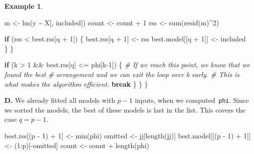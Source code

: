 \documentclass[
  a4paper,
]{article}
\newenvironment{Shaded}{\begin{snugshade}}{\end{snugshade}}
\newcommand{\CommentTok}[1]{\textcolor[rgb]{0.56,0.35,0.01}{\textit{#1}}}
\newcommand{\ControlFlowTok}[1]{\textcolor[rgb]{0.13,0.29,0.53}{\textbf{#1}}}
\newcommand{\DecValTok}[1]{\textcolor[rgb]{0.00,0.00,0.81}{#1}}
\newcommand{\FunctionTok}[1]{\textcolor[rgb]{0.00,0.00,0.00}{#1}}
\newcommand{\NormalTok}[1]{#1}
\newcommand{\OtherTok}[1]{\textcolor[rgb]{0.56,0.35,0.01}{#1}}
\newcommand{\SpecialCharTok}[1]{\textcolor[rgb]{0.00,0.00,0.00}{#1}}
\theoremstyle{definition}
\theoremstyle{definition}
\newtheorem{example}{Example}[section]
\theoremstyle{definition}
\theoremstyle{definition}
\theoremstyle{remark}
\begin{document}
\begin{example}
\begin{Shaded}
\begin{Highlighting}[]
\NormalTok{            m }\OtherTok{\textless{}{-}} \FunctionTok{lm}\NormalTok{(y }\SpecialCharTok{\textasciitilde{}}\NormalTok{ X[, included])}
\NormalTok{            count }\OtherTok{\textless{}{-}}\NormalTok{ count }\SpecialCharTok{+} \DecValTok{1}
\NormalTok{            rss }\OtherTok{\textless{}{-}} \FunctionTok{sum}\NormalTok{(}\FunctionTok{resid}\NormalTok{(m)}\SpecialCharTok{\^{}}\DecValTok{2}\NormalTok{)}

            \ControlFlowTok{if}\NormalTok{ (rss }\SpecialCharTok{\textless{}}\NormalTok{ best.rss[q }\SpecialCharTok{+} \DecValTok{1}\NormalTok{]) \{}
\NormalTok{                best.rss[q }\SpecialCharTok{+} \DecValTok{1}\NormalTok{] }\OtherTok{\textless{}{-}}\NormalTok{ rss}
\NormalTok{                best.model[[q }\SpecialCharTok{+} \DecValTok{1}\NormalTok{]] }\OtherTok{\textless{}{-}}\NormalTok{ included}
\NormalTok{            \}}
\NormalTok{        \}}

        \ControlFlowTok{if}\NormalTok{ (k }\SpecialCharTok{\textgreater{}} \DecValTok{1} \SpecialCharTok{\&\&}\NormalTok{ best.rss[q] }\SpecialCharTok{\textless{}=}\NormalTok{ phi[k}\DecValTok{{-}1}\NormalTok{]) \{}
            \CommentTok{\# If we reach this point, we know that we found the best}
            \CommentTok{\# arrangement and we can exit the loop over k early.}
            \CommentTok{\# This is what makes the algorithm efficient.}
            \ControlFlowTok{break}
\NormalTok{        \}}
\NormalTok{    \}}
\NormalTok{\}}
\end{Highlighting}
\end{Shaded}

\textbf{D.} We already fitted all models with \(p-1\) inputs, when we computed~\texttt{phi}.
Since we sorted the models, the best of these models is last in the list.
This covers the case \(q = p - 1\).

\begin{Shaded}
\begin{Highlighting}[]
\NormalTok{best.rss[(p }\SpecialCharTok{{-}} \DecValTok{1}\NormalTok{) }\SpecialCharTok{+} \DecValTok{1}\NormalTok{] }\OtherTok{\textless{}{-}} \FunctionTok{min}\NormalTok{(phi)}
\NormalTok{omitted }\OtherTok{\textless{}{-}}\NormalTok{ jj[}\FunctionTok{length}\NormalTok{(jj)]}
\NormalTok{best.model[[(p }\SpecialCharTok{{-}} \DecValTok{1}\NormalTok{) }\SpecialCharTok{+} \DecValTok{1}\NormalTok{]] }\OtherTok{\textless{}{-}}\NormalTok{ (}\DecValTok{1}\SpecialCharTok{:}\NormalTok{p)[}\SpecialCharTok{{-}}\NormalTok{omitted]}
\NormalTok{count }\OtherTok{\textless{}{-}}\NormalTok{ count }\SpecialCharTok{+} \FunctionTok{length}\NormalTok{(phi)}
\end{Highlighting}
\end{Shaded}


\end{example}
\end{document}
